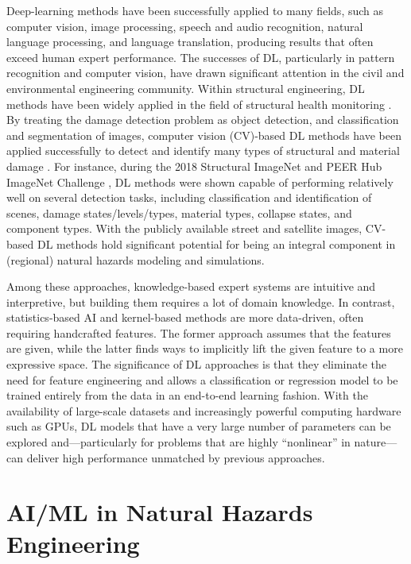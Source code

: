 Deep-learning methods have been successfully applied to many fields, such as computer vision, image processing, speech and audio recognition, natural language processing, and language translation, producing results that often exceed human expert performance. The successes of DL, particularly in pattern recognition and computer vision, have drawn significant attention in the civil and environmental engineering community. Within structural engineering, DL methods have been widely applied in the field of structural health monitoring \citep{salehia2018emerging}. By treating the damage detection problem as object detection, and classification and segmentation of images, computer vision (CV)-based DL methods have been applied successfully to detect and identify many types of structural and material damage \citep{cha2017deep, ferguson2018detection, gao2018deep, yeum2019automated, lenjani2020automated}. For instance, during the 2018 Structural ImageNet and PEER Hub ImageNet Challenge \citep{gao2018structural}, DL methods were shown capable of performing relatively well on several detection tasks, including classification and identification of scenes, damage states/levels/types, material types, collapse states, and component types. With the publicly available street and satellite images, CV-based DL methods hold significant potential for being an integral component in (regional) natural hazards modeling and simulations.

Among these approaches, knowledge-based expert systems are intuitive and interpretive, but building them requires a lot of domain knowledge. In contrast, statistics-based AI and kernel-based methods are more data-driven, often requiring handcrafted features. The former approach assumes that the features are given, while the latter finds ways to implicitly lift the given feature to a more expressive space. The significance of DL approaches is that they eliminate the need for feature engineering and allows a classification or regression model to be trained entirely from the data in an end-to-end learning fashion. With the availability of large-scale datasets and increasingly powerful computing hardware such as GPUs, DL models that have a very large number of parameters can be explored and---particularly for problems that are highly ``nonlinear'' in nature---can deliver high performance unmatched by previous approaches.

\section{AI/ML in Natural Hazards Engineering}
\label{sec:ai_nathaz}

